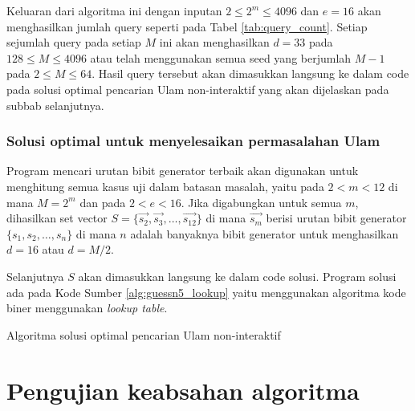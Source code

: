 Keluaran dari algoritma ini dengan inputan $2 \leq 2^m \leq 4096$ dan $e=16$ akan menghasilkan jumlah query seperti pada Tabel \ref{tab:query_count}. Setiap sejumlah query pada setiap $M$ ini akan menghasilkan $d = 33$ pada $128 \leq M \leq 4096$ atau telah menggunakan semua seed yang berjumlah $M-1$ pada $2 \leq M \leq 64$. Hasil query tersebut akan dimasukkan langsung ke dalam code pada solusi optimal pencarian Ulam non-interaktif yang akan dijelaskan pada subbab selanjutnya.

\subsubsection{Solusi optimal untuk menyelesaikan permasalahan Ulam}

Program mencari urutan bibit generator terbaik akan digunakan untuk menghitung semua kasus uji dalam batasan masalah, yaitu pada $2 < m < 12$ di mana $M = 2^m$ dan pada $2 < e < 16$. Jika digabungkan untuk semua $m$, dihasilkan set vector $S = \{\vec{s_2}, \vec{s_3}, \ldots, \vec{s_12}\}$ di mana $\vec{s_m}$ berisi urutan bibit generator $\{s_1, s_2, \ldots, s_n\}$ di mana $n$ adalah banyaknya bibit generator untuk menghasilkan $d=16$ atau $d=M/2$.

Selanjutnya $S$ akan dimasukkan langsung ke dalam code solusi. Program solusi ada pada Kode Sumber \ref{alg:guessn5_lookup} yaitu menggunakan algoritma kode biner menggunakan \textit{lookup table}.

\begin{algorithm}[h]
\caption{Algoritma solusi optimal pencarian Ulam non-interaktif}
\label{alg:guessn5_lookup}
\Fn{lookup\_binary\_code($M$, $e$)}{
\KwData{$M$ search space, $e$ max lies allowed}
\KwResult{$queries$}
  $queries = [\ ]$\;
  $the\_real\_M = M$\;
  $m = \text{ceil}(\log_2(M))$\;
  $M = 2^m$\;
  $d = (2e + 1)$\;
  $minimal[d] = [\ ]$\;
  $distances[M] = [\ ]$\;
  $code\_order$ = preloaded exhaustive\_search($2 \leq 2^m \leq 4096$, $16$)\;

  \For{$i = 0$ \KwTo $M-1$}{
    $min = \infty$\;
    $query = \text{generate\_query}(M, code\_order[m][i])$\;
    update the $distances$ after $query$\;
    $min$ = min($distances$)\;
    $queries$.push($query$.substr($the\_real\_M$))\;
    \lIf{$min \geq d$}{break}
  }

  \Return $queries$\;
}
\end{algorithm}


\section{Pengujian keabsahan algoritma}

